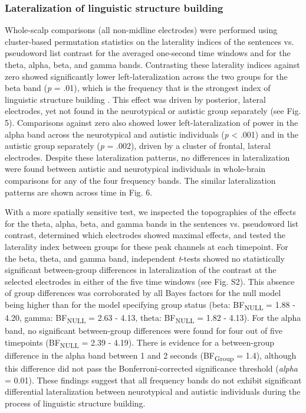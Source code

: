 
\subsubsection*{Lateralization of linguistic structure building}
Whole-scalp comparisons (all non-midline electrodes) were performed using cluster-based permutation statistics on the laterality indices of the sentences vs. pseudoword list contrast for the averaged one-second time windows and for the theta, alpha, beta, and gamma bands. Contrasting these laterality indices against zero showed significantly lower left-lateralization across the two groups for the beta band (\textit{p} = .01), which is the frequency that is the strongest index of linguistic structure building \citep{bastiaansen2010,bastiaansen2015}. This effect was driven by posterior, lateral electrodes, yet not found in the neurotypical or autistic group separately (see Fig. 5). Comparisons against zero also showed lower left-lateralization of power in the alpha band across the neurotypical and autistic individuals (\textit{p} <  .001) and in the autistic group separately (\textit{p} = .002), driven by a cluster of frontal, lateral electrodes. Despite these lateralization patterns, no differences in lateralization were found between autistic and neurotypical individuals in whole-brain comparisons for any of the four frequency bands. The similar lateralization patterns are shown across time in Fig. 6.


With a more spatially sensitive test, we inspected the topographies of the effects for the theta, alpha, beta, and gamma bands in the sentences vs. pseudoword list contrast, determined which electrodes showed maximal effects, and tested the laterality index between groups for these peak channels at each timepoint. For the beta, theta, and gamma band, independent \textit{t}-tests showed no statistically significant between-group differences in lateralization of the contrast at the selected electrodes in either of the five time windows (see Fig. S2). This absence of group differences was corroborated by all Bayes factors for the null model being higher than for the model specifying group status (beta: BF\textsubscript{NULL} = 1.88 - 4.20, gamma: BF\textsubscript{NULL} = 2.63 - 4.13, theta: BF\textsubscript{NULL} = 1.82 - 4.13). For the alpha band, no significant between-group differences were found for four out of five timepoints (BF\textsubscript{NULL} = 2.39 - 4.19). There is evidence for a between-group difference in the alpha band between 1 and 2 seconds (BF\textsubscript{Group} = 1.4), although this difference did not pass the Bonferroni-corrected significance threshold (\textit{alpha}  = 0.01). These findings suggest that all frequency bands do not exhibit significant differential lateralization between neurotypical and autistic individuals during the process of linguistic structure building. 

